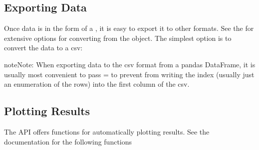 \documentclass[letterpaper,10pt,english,openany,oneside]{sphinxmanual}
\begin{document}
\subsection{Exporting Data}
\label{\detokenize{ext_guide:exporting-data}}
\sphinxAtStartPar
Once data is in the form of a , it is easy
to export it to other formats. See the
for extensive options for converting from the  object.
The simplest option is to convert the data to a csv:

\begin{sphinxVerbatim}[commandchars=\\\{\}]
 
\end{sphinxVerbatim}

\begin{sphinxadmonition}{note}{Note:}
\sphinxAtStartPar
When exporting data to the csv format from a pandas
DataFrame, it is usually most convenient to pass  = 
to prevent  from writing
the index (usually just an enumeration of the rows) into the
first column of the csv.
\end{sphinxadmonition}


\subsection{Plotting Results}
\label{\detokenize{ext_guide:plotting-results}}
\sphinxAtStartPar
The {\hyperref[\detokenize{api/pytb.ThunderBoltz:pytb.ThunderBoltz}]{}} API offers functions for
automatically plotting results. See the documentation for the following
functions
\end{document}
